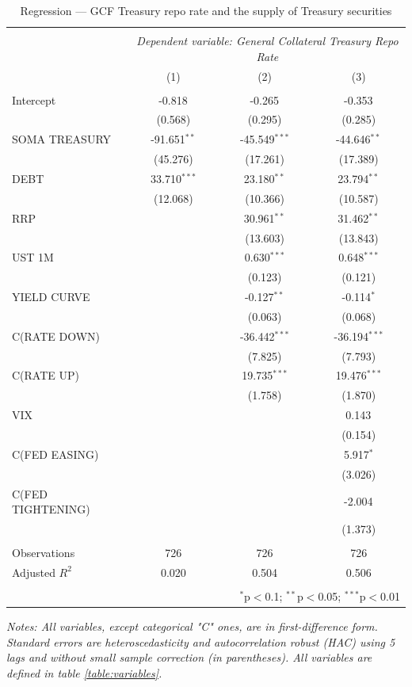\documentclass[11pt,a4paper,english,oneside]{article}
\begin{document}
\begin{table}[!htbp] \centering
\caption{Regression --- GCF Treasury repo rate and the supply of Treasury securities}
\begin{tabular}{@{\extracolsep{5pt}}lccc}
\\[-1.8ex]\hline
\hline \\[-1.8ex]
& \multicolumn{3}{c}{\textit{Dependent variable: General Collateral Treasury Repo Rate}} \
\cr \cline{3-4}
  \\[-1.8ex] & (1) & (2) & (3) \\
\hline \\[-1.8ex]
 Intercept & -0.818$^{}$ & -0.265$^{}$ & -0.353$^{}$ \\
  & (0.568) & (0.295) & (0.285) \\
 SOMA TREASURY & -91.651$^{**}$ & -45.549$^{***}$ & -44.646$^{**}$ \\
  & (45.276) & (17.261) & (17.389) \\
 DEBT & 33.710$^{***}$ & 23.180$^{**}$ & 23.794$^{**}$ \\
  & (12.068) & (10.366) & (10.587) \\
 RRP & & 30.961$^{**}$ & 31.462$^{**}$ \\
  & & (13.603) & (13.843) \\
 UST 1M & & 0.630$^{***}$ & 0.648$^{***}$ \\
  & & (0.123) & (0.121) \\
 YIELD CURVE & & -0.127$^{**}$ & -0.114$^{*}$ \\
  & & (0.063) & (0.068) \\
 C(RATE DOWN) & & -36.442$^{***}$ & -36.194$^{***}$ \\
  & & (7.825) & (7.793) \\
 C(RATE UP) & & 19.735$^{***}$ & 19.476$^{***}$ \\
  & & (1.758) & (1.870) \\
 VIX & & & 0.143$^{}$ \\
  & & & (0.154) \\
 C(FED EASING) & & & 5.917$^{*}$ \\
  & & & (3.026) \\
 C(FED TIGHTENING) & & & -2.004$^{}$ \\
  & & & (1.373) \\
\hline \\[-1.8ex]
 Observations & 726 & 726 & 726 \\
 Adjusted $R^2$ & 0.020 & 0.504 & 0.506 \\
\hline
\hline \\[-1.8ex]
  & \multicolumn{3}{r}{$^{*}$p$<$0.1; $^{**}$p$<$0.05; $^{***}$p$<$0.01} \\[8pt]
\end{tabular}
\begin{flushleft}
  \textit{Notes: All variables, except categorical "C" ones, are in first-difference form. Standard errors are heteroscedasticity and autocorrelation robust (HAC) using 5 lags and without small sample correction (in parentheses). All variables are defined in table \ref{table:variables}.}
\end{flushleft}
\label{table:reg1}
\end{table}
\end{document}
